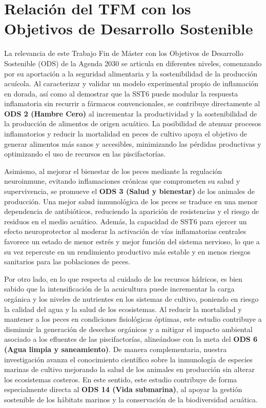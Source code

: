 \documentclass[10pt,a4paper]{article}
\begin{document}
\section{Relación del TFM con los Objetivos de Desarrollo Sostenible }
La relevancia de este Trabajo Fin de Máster con los Objetivos de Desarrollo Sostenible (ODS) de la Agenda 2030 se articula en diferentes niveles, comenzando por su aportación a la seguridad alimentaria y la sostenibilidad de la producción acuícola. Al caracterizar y validar un modelo experimental propio de inflamación en dorada, así como al demostrar que la SST6 puede modular la respuesta inflamatoria sin recurrir a fármacos convencionales, se contribuye directamente al  \textbf{ODS 2 (Hambre Cero)} al incrementar la productividad y la sostenibilidad de la producción de alimentos de origen acuático. La posibilidad de atenuar procesos inflamatorios y reducir la mortalidad en peces de cultivo apoya el objetivo de generar alimentos más sanos y accesibles, minimizando las pérdidas productivas y optimizando el uso de recursos en las piscifactorías.

Asimismo, al mejorar el bienestar de los peces mediante la regulación neuroinmune, evitando inflamaciones crónicas que comprometen su salud y supervivencia, se promueve el  \textbf{ODS 3 (Salud y bienestar)} de los animales de producción. Una mejor salud inmunológica de los peces se traduce en una menor dependencia de antibióticos, reduciendo la aparición de resistencias y el riesgo de residuos en el medio acuático. Además, la capacidad de SST6 para ejercer un efecto neuroprotector al moderar la activación de vías inflamatorias centrales favorece un estado de menor estrés y mejor función del sistema nervioso, lo que a su vez repercute en un rendimiento productivo más estable y en menos riesgos sanitarios para las poblaciones de peces. 

Por otro lado, en lo que respecta al cuidado de los recursos hídricos, es bien sabido que la intensificación de la acuicultura puede incrementar la carga orgánica y los niveles de nutrientes en los sistemas de cultivo, poniendo en riesgo la calidad del agua y la salud de los ecosistemas. Al reducir la mortalidad y mantener a los peces en condiciones fisiológicas óptimas, este estudio contribuye a disminuir la generación de desechos orgánicos y a mitigar el impacto ambiental asociado a los efluentes de las piscifactorías, alineándose con la meta del  \textbf{ODS 6 (Agua limpia y saneamiento)}. De manera complementaria, nuestra investigación avanza el conocimiento científico sobre la inmunología de especies marinas de cultivo mejorando la salud de los animales en producción sin alterar los ecosistemas costeros. En este sentido, este estudio contribuye de forma especialmente directa al \textbf{ODS 14 (Vida submarina)}, al apoyar la gestión sostenible de los hábitats marinos y la conservación de la biodiversidad acuática.
\end{document}
